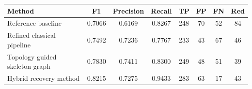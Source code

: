 {\small
\setlength{\tabcolsep}{5pt}
\begin{tabular}{p{5.0cm}ccccccc}
\toprule
Method & F1 & Precision & Recall & TP & FP & FN & Red \\
\midrule
 Reference baseline & 0.7066 & 0.6169 & 0.8267 & 248 & 70 & 52 & 84 \\
 Refined classical pipeline & 0.7492 & 0.7236 & 0.7767 & 233 & 43 & 67 & 46 \\
 Topology guided skeleton graph & 0.7830 & 0.7411 & 0.8300 & 249 & 48 & 51 & 39 \\
 Hybrid recovery method & 0.8215 & 0.7275 & 0.9433 & 283 & 63 & 17 & 43 \\
\bottomrule
\end{tabular}
}